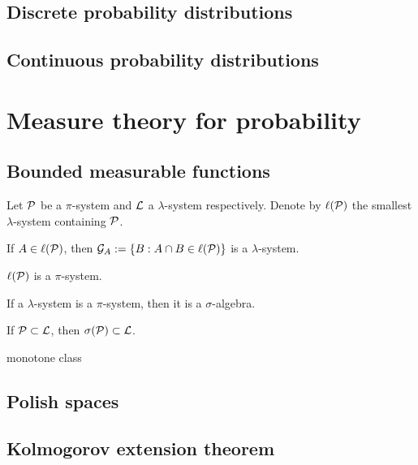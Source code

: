\documentclass{../note}
\begin{document}
\section{Discrete probability distributions}

\section{Continuous probability distributions}










\chapter{Measure theory for probability}


\section{Bounded measurable functions}

\begin{prb}
Let $\mathcal{P}$ be a $\pi$-system and $\mathcal{L}$ a $\lambda$-system respectively.
Denote by $\ell(\mathcal{P})$ the smallest $\lambda$-system containing $\mathcal{P}$.
\begin{parts}
\item If $A\in\ell(\mathcal{P})$, then $\mathcal{G}_A:=\{B:A\cap B\in\ell(\mathcal{P})\}$ is a $\lambda$-system.
\item $\ell(\mathcal{P})$ is a $\pi$-system.
\item If a $\lambda$-system is a $\pi$-system, then it is a $\sigma$-algebra.
\item If $\mathcal{P}\subset\mathcal{L}$, then $\sigma(\mathcal{P})\subset\mathcal{L}$.
\end{parts}
\end{prb}

monotone class



\section{Polish spaces}



\section{Kolmogorov extension theorem}
\end{document}

